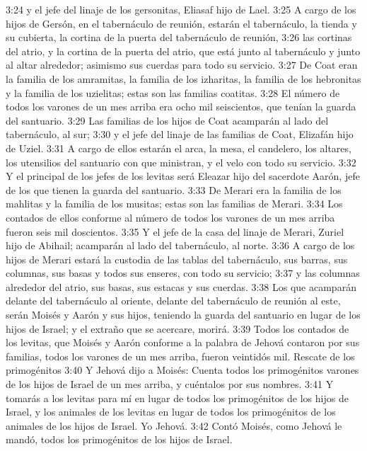 3:24 y el jefe del linaje de los gersonitas, Eliasaf hijo de Lael.  
3:25 A cargo de los hijos de Gersón, en el tabernáculo de reunión, estarán el tabernáculo, la tienda y su cubierta, la cortina de la puerta del tabernáculo de reunión,  
3:26 las cortinas del atrio, y la cortina de la puerta del atrio, que está junto al tabernáculo y junto al altar alrededor; asimismo sus cuerdas para todo su servicio.  
3:27 De Coat eran la familia de los amramitas, la familia de los izharitas, la familia de los hebronitas y la familia de los uzielitas; estas son las familias coatitas.  
3:28 El número de todos los varones de un mes arriba era ocho mil seiscientos, que tenían la guarda del santuario.  
3:29 Las familias de los hijos de Coat acamparán al lado del tabernáculo, al sur;  
3:30 y el jefe del linaje de las familias de Coat, Elizafán hijo de Uziel.  
3:31 A cargo de ellos estarán el arca, la mesa, el candelero, los altares, los utensilios del santuario con que ministran, y el velo con todo su servicio.  
3:32 Y el principal de los jefes de los levitas será Eleazar hijo del sacerdote Aarón, jefe de los que tienen la guarda del santuario.  
3:33 De Merari era la familia de los mahlitas y la familia de los musitas; estas son las familias de Merari.  
3:34 Los contados de ellos conforme al número de todos los varones de un mes arriba fueron seis mil doscientos.  
3:35 Y el jefe de la casa del linaje de Merari, Zuriel hijo de Abihail; acamparán al lado del tabernáculo, al norte.  
3:36 A cargo de los hijos de Merari estará la custodia de las tablas del tabernáculo, sus barras, sus columnas, sus basas y todos sus enseres, con todo su servicio;  
3:37 y las columnas alrededor del atrio, sus basas, sus estacas y sus cuerdas.  
3:38 Los que acamparán delante del tabernáculo al oriente, delante del tabernáculo de reunión al este, serán Moisés y Aarón y sus hijos, teniendo la guarda del santuario en lugar de los hijos de Israel; y el extraño que se acercare, morirá.  
3:39 Todos los contados de los levitas, que Moisés y Aarón conforme a la palabra de Jehová contaron por sus familias, todos los varones de un mes arriba, fueron veintidós mil.  
Rescate de los primogénitos  
3:40 Y Jehová dijo a Moisés: Cuenta todos los primogénitos varones de los hijos de Israel de un mes arriba, y cuéntalos por sus nombres.  
3:41 Y tomarás a los levitas para mí en lugar de todos los primogénitos de los hijos de Israel, y los animales de los levitas en lugar de todos los primogénitos de los animales de los hijos de Israel. Yo Jehová.  
3:42 Contó Moisés, como Jehová le mandó, todos los primogénitos de los hijos de Israel.  
